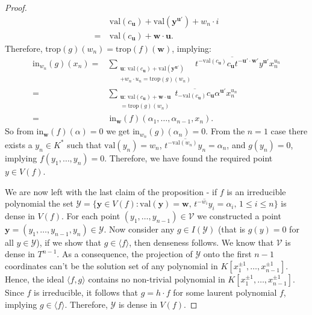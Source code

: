 \begin{proof}
\begin{align*}
            &~ \text{val}(c_{\textbf{u}}) + \text{val}(\textbf{y}^{\textbf{u}'}) + w_{n}\cdot i\\
            =& ~\text{val}(c_{\textbf{u}}) + \textbf{w} \cdot \textbf{u}.
        \end{align*}
        Therefore, $\text{trop}(g)(w_{n}) = \text{trop}(f)(\textbf{w})$, implying:
        \begin{align*}
            \text{in}_{w_{n}}(g)(x_{n}) =& \sum_{\substack{\textbf{u}:\, \text{val}(c_{\textbf{u}}) + \text{val}(\textbf{y}^{\textbf{u}'}) \\+ w_{n}\cdot u_{n} = \text{trop}(g)(w_{n})}} \overline{t^{-\text{val}(c_{\textbf{u}})}c_{\textbf{u}}t^{-\textbf{u}'\cdot \textbf{w}'}y^{\textbf{u}'}}x^{u_n}_{n} \\
            =& \sum_{\substack{\textbf{u}:\, \text{val}(c_{\textbf{u}}) + \textbf{w} \cdot \textbf{u} \\= \text{trop}(g)(w_{n})}}\overline{t_{-\text{val}(c_{\textbf{u}})}c_{\textbf{u}}}\alpha^{\textbf{u}'}x^{u_{n}}_{n}\\
            =& ~ \text{in}_{\textbf{w}}(f)(\alpha_{1}, \dots, \alpha_{n-1}, x_{n}).
        \end{align*}
        So from $\text{in}_{\textbf{w}}(f)(\alpha) = 0$ we get $\text{in}_{w_{n}}(g)(\alpha_{n}) = 0$.
        From the $n=1$ case there exists a $y_{n} \in K^{*}$ such that $\text{val}(y_n) = w_n$, $\overline{t^{-\text{val}(w_{n})}y_{n}} = \alpha_{n}$, and $g(y_{n}) = 0$, implying $f(y_1,\dots,y_n) = 0$.
        Therefore, we have found the required point $y \in V(f)$.
        \par We are now left with the last claim of the proposition - if $f$ is an irreducible polynomial the set $\mathcal{Y} = \{\textbf{y}\in V(f): \text{val}(\textbf{y}) = \textbf{w},\, \overline{t^{-w_{i}}y_{i}} = \alpha_{i},\, 1\leq i\leq n\}$ is dense in $V(f)$.
        For each point $(y_{1},\dots, y_{n-1}) \in \mathcal{V}$ we constructed a point $\textbf{y} = (y_{1},\dots, y_{n-1}, y_{n}) \in \mathcal{Y}$.
        Now consider any $g \in I(\mathcal{Y})$ (that is $g(y)= 0$ for all $y \in \mathcal{Y}$), if we show that $g\in \langle f \rangle$, then denseness follows.
        We know that $\mathcal{V}$ is dense in $T^{n-1}$.
        As a consequence, the projection of $\mathcal{Y}$ onto the first $n-1$ coordinates can't be the solution set of any polynomial in $ K[x_{1}^{\pm1}, \dots, x_{n-1}^{\pm1}]$.
        Hence, the ideal $\langle f,g \rangle$ contains no non-trivial polynomial in $ K[x_{1}^{\pm1}, \dots, x_{n-1}^{\pm1}]$.
        Since $f$ is irreducible, it follows that $g = h \cdot f$ for some laurent polynomial $f$, implying $g \in\langle f \rangle$.
        Therefore, $\mathcal{Y}$ is dense in $V(f)$.
    \end{proof}

